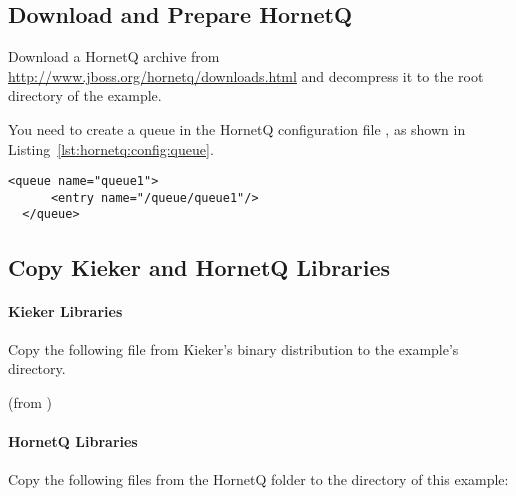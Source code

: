 \subsection{Download and Prepare HornetQ}

Download a HornetQ archive from \url{http://www.jboss.org/hornetq/downloads.html} %
and decompress it to the root directory of the example. 

\noindent You need to create a queue in the HornetQ configuration file %
, as shown in Listing~\ref{lst:hornetq:config:queue}.

\setXMLListing
\begin{lstlisting}[caption=Queue definition to be added to the HornetQ configuration file,label=lst:hornetq:config:queue,numbers=none]
  <queue name="queue1">
      <entry name="/queue/queue1"/>
  </queue>
\end{lstlisting}

\subsection{Copy Kieker and HornetQ Libraries}

\paragraph*{Kieker Libraries}

Copy the following file from Kieker's binary distribution to %
the example's  directory.

\medskip

\begin{compactenum}
 \item \file{\mainJarEMF} (from )
\end{compactenum}

\paragraph*{HornetQ Libraries}

Copy the following files from the HornetQ  folder to the %
 directory of this example:

\medskip

\begin{compactenum}
\item {}
\item {}
\item {}
\item {}
\item {}
\end{compactenum}

